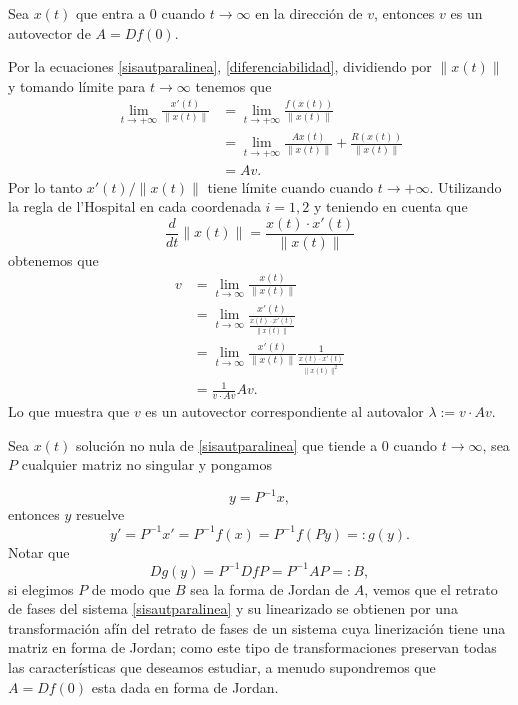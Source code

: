 \begin{teorema}\label{solentra} Sea $x(t)$ que entra a $0$ cuando $t\to\infty$ en
la dirección de $v$, entonces $v$ es un autovector de $A=Df(0)$.
\end{teorema}

\begin{demo} Por la ecuaciones \eqref{sisautparalinea},
\eqref{diferenciabilidad}, dividiendo por $\|x(t)\|$ y tomando
límite para $t\to\infty$ tenemos que
\[
    \begin{split}
    \lim\limits_{t\to+\infty}\frac{x'(t)}{\|x(t)\|} &=
    \lim\limits_{t\to+\infty}\frac{f(x(t))}{\|x(t)\|}\\
     &=\lim\limits_{t\to+\infty}\frac{Ax(t)}{\|x(t)\|}+\frac{R(x(t))}{\|x(t)\|}\\
     &= Av.
    \end{split}
\]
Por lo tanto $x'(t)/\|x(t)\|$ tiene límite cuando  cuando
$t\to+\infty$. Utilizando la regla de l'Hospital en cada
coordenada $i=1,2$ y teniendo en cuenta que
\[
    \frac{d}{dt}\|x(t)\|=\frac{x(t)\cdot x'(t)}{\|x(t)\|}
\]
obtenemos que
\[
    \begin{split}
     v&=\lim\limits_{t\to\infty}\frac{x(t)}{\|x(t)\|}\\
     &= \lim\limits_{t\to\infty}\frac{x'(t)}{\frac{x(t)\cdot
     x'(t)}{\|x(t)\|}}\\
     &=\lim\limits_{t\to\infty}\frac{x'(t)}{\|x(t)\|}\frac{1}{\frac{x(t)\cdot
     x'(t)}{\|x(t)\|^2}}\\
     &=\frac{1}{v\cdot Av}Av.
    \end{split}
\]
Lo que muestra que $v$ es un autovector correspondiente al
autovalor $\lambda:=v\cdot Av$.\end{demo}




Sea $x(t)$ solución no nula de \eqref{sisautparalinea} que tiende
a $0$ cuando $t\to\infty$, sea $P$ cualquier matriz no singular y
pongamos

\begin{equation}\label{cambioafin}
    y=P^{-1}x,
\end{equation}
 entonces $y$ resuelve
\[
    y'=P^{-1}x'=P^{-1}f(x)=P^{-1}f(Py)=:g(y).
\]
Notar que
\[
    Dg(y)=P^{-1}DfP=P^{-1}AP=:B,
\]
si elegimos $P$ de modo que $B$ sea la forma de Jordan de $A$,
vemos que el retrato de fases del sistema \eqref{sisautparalinea}
y su  linearizado se obtienen por una transformación afín del
retrato de fases de un sistema cuya linerización tiene una matriz
en forma de Jordan; como este tipo de transformaciones preservan
todas las características que deseamos estudiar,  a menudo
supondremos que $A=Df(0)$ esta dada en forma de Jordan.




